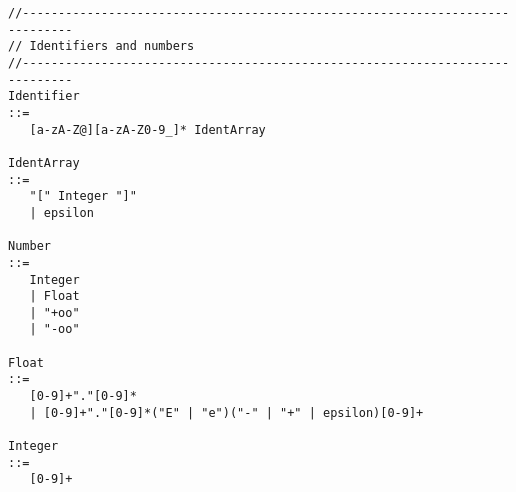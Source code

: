 {\begin{verbatim}
//-----------------------------------------------------------------------------
// Identifiers and numbers
//-----------------------------------------------------------------------------
Identifier
::=
   [a-zA-Z@][a-zA-Z0-9_]* IdentArray

IdentArray
::=
   "[" Integer "]"
   | epsilon

Number
::=
   Integer         
   | Float           
   | "+oo"
   | "-oo"

Float
::=
   [0-9]+"."[0-9]*
   | [0-9]+"."[0-9]*("E" | "e")("-" | "+" | epsilon)[0-9]+

Integer
::=
   [0-9]+
\end{verbatim}}
